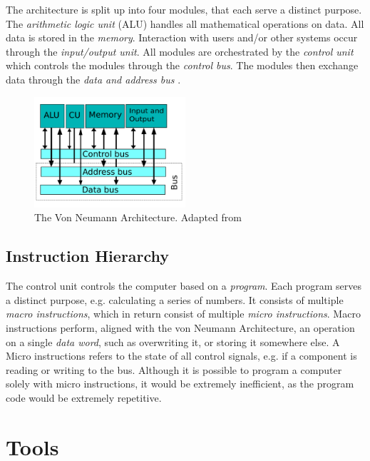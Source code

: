 The architecture is split up into four modules, that each serve a distinct purpose. The \textit{arithmetic logic unit} (ALU) handles all mathematical operations on data. All data is stored in the \textit{memory}. Interaction with users and/or other systems occur through the \textit{input/output unit}. All modules are orchestrated by the \textit{control unit} which controls the modules through the \textit{control bus}. The modules then exchange data through the \textit{data and address bus} \cite{vonneumann1}.

\begin{figure}[H]
  \begin{center}
    \includegraphics[width=0.5\textwidth]{figures/VNA}
  \end{center}
  \caption{The Von Neumann Architecture. Adapted from \cite{fig-vna}}\label{fig:vna}
\end{figure}

\subsection{Instruction Hierarchy}
The control unit controls the computer based on a \textit{program}. Each program serves a distinct purpose, e.g. calculating a series of numbers. It consists of multiple \textit{macro instructions}, which in return consist of multiple \textit{micro instructions}. Macro instructions perform, aligned with the von Neumann Architecture, an operation on a single \textit{data word}, such as overwriting it, or storing it somewhere else. A Micro instructions refers to the state of all control signals, e.g. if a component is reading or writing to the bus. Although it is possible to program a computer solely with micro instructions, it would be extremely inefficient, as the program code would be extremely repetitive.

\section{Tools} \label{sec:tools}

